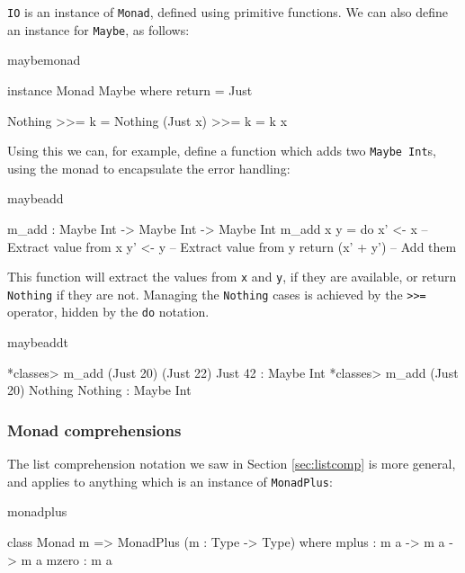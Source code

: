 \noindent
\texttt{IO} is an instance of \texttt{Monad}, defined using primitive functions.
We can also define an instance for \texttt{Maybe}, as follows:

\begin{SaveVerbatim}{maybemonad}

instance Monad Maybe where
    return = Just

    Nothing  >>= k = Nothing
    (Just x) >>= k = k x

\end{SaveVerbatim}

\noindent
Using this we can, for example, define a function which adds two 
\texttt{Maybe Int}s, using the monad to encapsulate the error handling:

\begin{SaveVerbatim}{maybeadd}

m_add : Maybe Int -> Maybe Int -> Maybe Int
m_add x y = do x' <- x -- Extract value from x
               y' <- y -- Extract value from y
               return (x' + y') -- Add them 

\end{SaveVerbatim}

\noindent
This function will extract the values from \texttt{x} and \texttt{y}, if they
are available, or return \texttt{Nothing} if they are not. Managing the
\texttt{Nothing} cases is achieved by the \texttt{>>=} operator, hidden by the
\texttt{do} notation.

\begin{SaveVerbatim}{maybeaddt}

*classes> m_add (Just 20) (Just 22) 
Just 42 : Maybe Int
*classes> m_add (Just 20) Nothing 
Nothing : Maybe Int

\end{SaveVerbatim}

\subsubsection*{Monad comprehensions}

The list comprehension notation we saw in Section \ref{sec:listcomp} is more
general, and applies to anything which is an instance of \texttt{MonadPlus}:

\begin{SaveVerbatim}{monadplus}

class Monad m => MonadPlus (m : Type -> Type) where
    mplus : m a -> m a -> m a
    mzero : m a

\end{SaveVerbatim}

